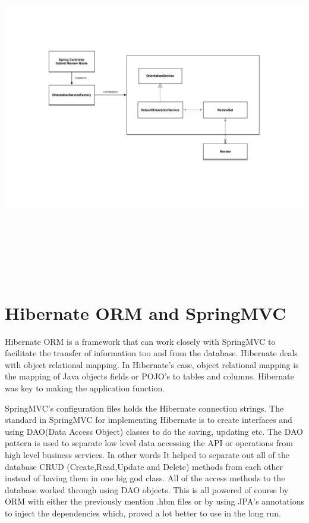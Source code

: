 \begin{center}    
	\includegraphics[height=15cm, width=15cm]{img/objectModel.png}
\end{center}

\section{Hibernate ORM and SpringMVC}

Hibernate ORM is a framework that can work closely with SpringMVC to facilitate the transfer of information too and from the database. Hibernate deals with object relational mapping. In Hibernate's case, object relational mapping is the mapping of Java objects fields or POJO's to tables and columns. Hibernate was key to making the application function. \newline 

\noindent SpringMVC's configuration files holds the Hibernate connection strings. The standard in SpringMVC for implementing Hibernate is to create interfaces and using DAO(Data Access Object) classes to do the saving, updating etc. The DAO pattern is used to separate low level data accessing the API or operations from high level business services. In other words It helped to separate out all of the database CRUD (Create,Read,Update and Delete) methods from each other instead of having them in one big god class. All of the access methods to the database worked through using DAO objects. This is all powered of course by ORM with either the previously mention .hbm files or by using JPA's annotations to inject the dependencies which, proved a lot better to use in the long run.\newline

